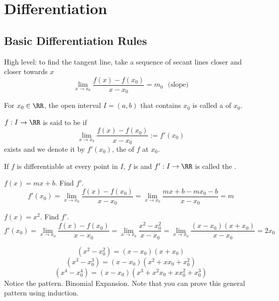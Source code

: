 \documentclass[12pt]{scrartcl}
\begin{document}
\section{Differentiation}

\subsection{Basic Differentiation Rules}

\begin{remark}
  High level: to find the tangent line, take a sequence of secant lines closer and 
  closer towards $x$
  \[\lim_{x\to x_0}\frac{f(x) - f(x_0)}{x - x_0} = m_0 \ \ \ \text{(slope)}\]
\end{remark}

\begin{definition}
  For $x_0 \in \RR$, the open interval $I = (a, b)$  that contains $x_0$ 
  is called a  of $x_0$. 
\end{definition}

\begin{definition}
  $f: I \to \RR$ is said to be  if
  \[\underset{x\to x_0}{\lim}\frac{f(x) - f(x_0)}{x - x_0} := f'(x_0)\] exists 
  and we denote it by $f'(x_0)$, the  of $f$ at $x_0$.  
\end{definition}

\begin{remark}
  If $f$ is differentiable at every point in $I$, $f$ is  and 
  $f': I \to \RR$ is called the .
\end{remark}

\begin{example}
  $f(x) = mx + b$. Find $f'$.
  \[f'(x_0) = \lim_{x\to x_0}\frac{f(x) - f(x_0)}{x - x_0} = \lim_{x\to x_0}\frac{mx + b - mx_0 - b}{x - x_0} = m\]
\end{example}

\begin{example}
  $f(x) = x^2$. Find $f'$.
  \[f'(x_0) = \lim_{x\to x_0}\frac{f(x) - f(x_0)}{x - x_0} = \lim_{x\to x_0}\frac{x^2 - x_0^2}{x - x_0} = \lim_{x \to x_0} \frac{(x- x_0)(x+x_0)}{x-x_0} = 2x_0\]
\end{example}

\begin{note}
  \[(x^2 - x_0^2) = (x-x_0)(x+x_0)\]
  \[(x^3 - x_0^3) = (x-x_0)(x^2 + xx_0 + x_0^2)\]
  \[(x^4 - x_0^4) = (x-x_0)(x^3 + x^2x_0 + xx_0^2 + x_0^3)\]
  Notice the pattern. Binomial Expansion. Note that you can prove this general 
  pattern using induction.
\end{note}
\end{document}
